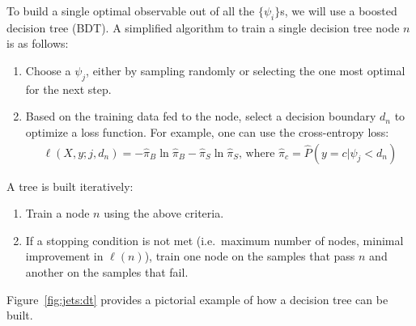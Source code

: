 To build a single optimal observable out of all the $\{\psi_i\}$s, we will use a boosted decision tree (BDT).
A simplified algorithm to train a single decision tree node $n$ is as follows:
\begin{enumerate}
    \item Choose a $\psi_j$, either by sampling randomly or selecting the one most optimal for the next step.
    \item Based on the training data fed to the node, select a decision boundary $d_n$ to optimize a loss function. For example, one can use the cross-entropy loss:
        \begin{gather}
            \ell(X,y;j,d_n) =  -\hat\pi_B\ln\hat\pi_B -\hat\pi_S\ln\hat\pi_S \text{, where } 
            \hat\pi_c = \hat P(y=c | \psi_j < d_n) 
        \end{gather}
\end{enumerate}
A tree is built iteratively:
\begin{enumerate}
    \item Train a node $n$ using the above criteria. 
    \item If a stopping condition is not met (i.e.~maximum number of nodes, minimal improvement in $\ell(n)$), train one node on the samples that pass $n$ and another on the samples that fail.
\end{enumerate}
Figure~\ref{fig:jets:dt} provides a pictorial example of how a decision tree can be built. 

